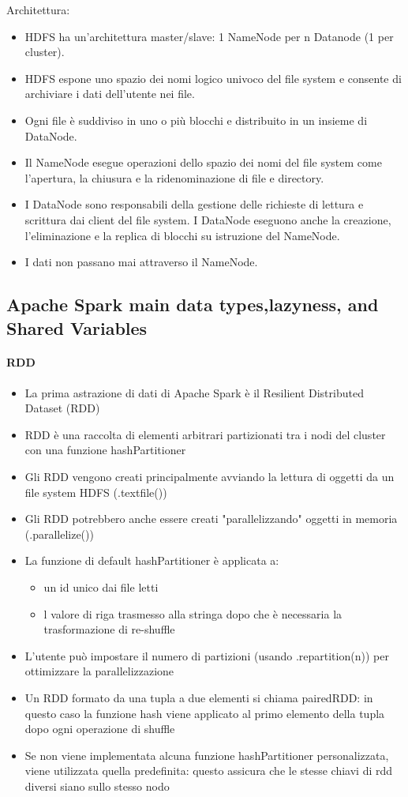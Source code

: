 \documentclass{article}
\begin{document}
Architettura:
\begin{itemize}
\item HDFS ha un'architettura master/slave: 1 NameNode per n Datanode (1 per cluster).
\item HDFS espone uno spazio dei nomi logico univoco del file system e consente di archiviare i dati dell'utente nei file.
\item Ogni file è suddiviso in uno o più blocchi e distribuito in un insieme di DataNode.
\item Il NameNode esegue operazioni dello spazio dei nomi del file system come l'apertura, la chiusura e la ridenominazione di file e directory.
\item I DataNode sono responsabili della gestione delle richieste di lettura e scrittura dai client del file system. I DataNode eseguono anche la creazione, l'eliminazione e la replica di blocchi su istruzione del NameNode.
\item I dati non passano mai attraverso il NameNode.
\end{itemize}

\subsection{Apache Spark main data types,lazyness, and Shared Variables}
\paragraph{RDD}
\begin{itemize}
    \item La prima astrazione di dati di Apache Spark è il Resilient Distributed Dataset (RDD)
    \item RDD è una raccolta di elementi arbitrari partizionati tra i nodi del cluster con una funzione hashPartitioner
    \item Gli RDD vengono creati principalmente avviando la lettura di oggetti da un file system HDFS (.textfile())
    \item Gli RDD potrebbero anche essere creati "parallelizzando" oggetti in memoria (.parallelize())
    \item La funzione di default hashPartitioner è applicata a:
    \begin{itemize}
        \item un id unico dai file letti
        \item l valore di riga trasmesso alla stringa dopo che è necessaria la trasformazione di re-shuffle
    \end{itemize}
    \item L'utente può impostare il numero di partizioni (usando .repartition(n)) per ottimizzare la parallelizzazione
    \item Un RDD formato da una tupla a due elementi si chiama pairedRDD: in questo caso la funzione hash viene applicato al primo elemento della tupla dopo ogni operazione di shuffle
    \item Se non viene implementata alcuna funzione hashPartitioner personalizzata, viene utilizzata quella predefinita: questo assicura che le stesse chiavi di rdd diversi siano sullo stesso nodo
\end{itemize}
\end{document}
